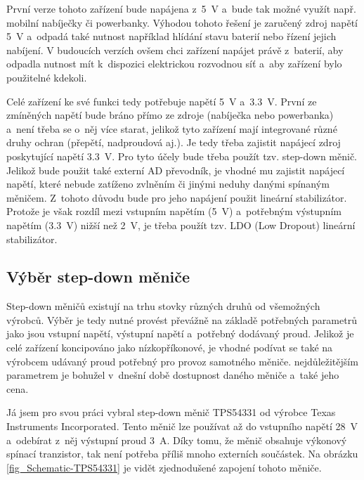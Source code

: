 První verze tohoto zařízení bude napájena z~\SI{5}{\volt} a~bude tak možné využít např. mobilní nabíječky či powerbanky. Výhodou tohoto řešení je zaručený zdroj napětí \SI{5}{\volt} a~odpadá také nutnost například hlídání stavu baterií nebo řízení jejich nabíjení. V budoucích verzích ovšem chci zařízení napájet právě z~baterií, aby odpadla nutnost mít k~dispozici elektrickou rozvodnou síť a~aby zařízení bylo použitelné kdekoli.

Celé zařízení ke své funkci tedy potřebuje napětí \SI{5}{\volt} a~\SI{3,3}{\volt}. První ze zmíněných napětí bude bráno přímo ze zdroje (nabíječka nebo powerbanka) a~není třeba se o~něj více starat, jelikož tyto zařízení mají integrované různé druhy ochran (přepětí, nadproudová aj.). Je tedy třeba zajistit napájecí zdroj poskytující napětí \SI{3,3}{\volt}. Pro tyto účely bude třeba použít tzv. step-down měnič. Jelikož bude použit také externí AD převodník, je vhodné mu zajistit napájecí napětí, které nebude zatíženo zvlněním či jinými neduhy danými spínaným měničem. Z~tohoto důvodu bude pro jeho napájení použit lineární stabilizátor. Protože je však rozdíl mezi vstupním napětím (\SI{5}{\volt}) a~potřebným výstupním napětím (\SI{3,3}{\volt}) nižší než \SI{2}{\volt}, je třeba použít tzv. LDO (Low Dropout) lineární stabilizátor.

\subsection{Výběr step-down měniče}

Step-down měničů existují na trhu stovky různých druhů od všemožných výrobců. Výběr je tedy nutné provést převážně na základě potřebných parametrů jako jsou vstupní napětí, výstupní napětí a~potřebný dodávaný proud. Jelikož je celé zařízení koncipováno jako nízkopříkonové, je vhodné podívat se také na výrobcem udávaný proud potřebný pro provoz samotného měniče. nejdůležitějším parametrem je bohužel v~dnešní době dostupnost daného měniče a~také jeho cena.

Já jsem pro svou práci vybral step-down měnič TPS54331 od výrobce Texas Instruments Incorporated\cite{dat_TPS54331}. Tento měnič lze používat až do vstupního napětí \SI{28}{\volt} a~odebírat z~něj výstupní proud \SI{3}{\ampere}. Díky tomu, že měnič obsahuje výkonový spínací tranzistor, tak není potřeba příliš mnoho externích součástek. Na obrázku \ref{fig_Schematic-TPS54331} je vidět zjednodušené zapojení tohoto měniče.

